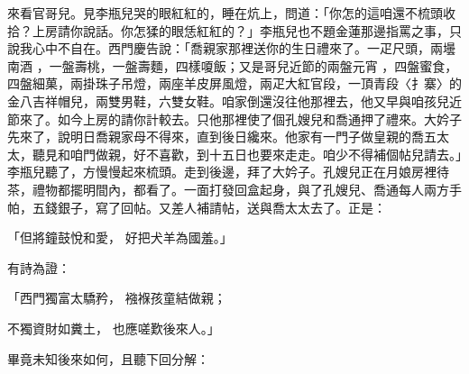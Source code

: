 \begin{showcontents}{}
來看官哥兒。見李瓶兒哭的眼紅紅的，睡在炕上，問道：「你怎的這咱還不梳頭收拾？上房請你說話。你怎猱的眼恁紅紅的？」李瓶兒也不題金蓮那邊指罵之事，只說我心中不自在。西門慶告說：「喬親家那裡送你的生日禮來了。一疋尺頭，兩壜南酒 ，一盤壽桃，一盤壽麵，四樣嗄飯；又是哥兒近節的兩盤元宵 ，四盤蜜食，四盤細菓，兩掛珠子吊燈，兩座羊皮屏風燈，兩疋大紅官段，一頂青段〈扌寨〉的金八吉祥帽兒，兩雙男鞋，六雙女鞋。咱家倒還沒往他那裡去，他又早與咱孩兒近節來了。如今上房的請你計較去。只他那裡使了個孔嫂兒和喬通押了禮來。大妗子先來了，說明日喬親家母不得來，直到後日纔來。他家有一門子做皇親的喬五太太，聽見和咱門做親，好不喜歡，到十五日也要來走走。咱少不得補個帖兒請去。」李瓶兒聽了，方慢慢起來梳頭。走到後邊，拜了大妗子。孔嫂兒正在月娘房裡待茶，禮物都擺明間內，都看了。一面打發回盒起身，與了孔嫂兒、喬通每人兩方手帕，五錢銀子，寫了回帖。又差人補請帖，送與喬太太去了。正是：

「但將鐘鼓悅和愛，   好把犬羊為國羞。」

有詩為證：

「西門獨富太驕矜，   襁褓孩童結做親；

不獨資財如糞土，   也應嗟歎後來人。」

畢竟未知後來如何，且聽下回分解：




\end{showcontents}


